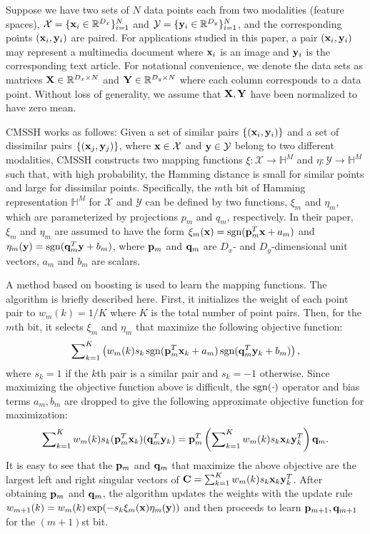 Suppose we have two sets of $N$ data points each from two modalities (\aka feature spaces), $\mathcal{X} = \{{\bf x}_i\in\mathbb{R}^{D_x}\}_{i=1}^{N}$ and $ \mathcal{Y} = \{{\bf y}_i\in\mathbb{R}^{D_y}\}_{i=1}^{N}$, and the corresponding points $({\bf x}_i,{\bf y}_i)$ are paired.  For applications studied in this paper, a pair $({\bf x}_i,{\bf y}_i)$ may represent a multimedia document where ${\bf x}_i$ is an image and ${\bf y}_i$ is the corresponding text article.  For notational convenience, we denote the data sets as matrices ${\bf X}\in\mathbb{R}^{D_x\times N}$ and ${\bf Y}\in\mathbb{R}^{D_y\times N}$ where each column corresponds to a data point. Without loss
of generality, we assume that ${\bf X},{\bf Y}$ have been normalized to have zero mean.

CMSSH works as follows: Given a set of similar pairs $\{({\bf x}_i,{\bf y}_i)\}$ and a set of dissimilar pairs $\{({\bf x}_j,{\bf y}_j)\}$, where ${\bf x}\in\mathcal{X}$ and ${\bf y}\in\mathcal{Y}$ belong to two different modalities, \mbox{CMSSH} constructs two mapping functions $\xi:\mathcal{X}\rightarrow\mathbb{H}^{M}$ and $\eta:\mathcal{Y}\rightarrow\mathbb{H}^{M}$ such that, with high probability, the Hamming distance is small for similar points and large for dissimilar points. Specifically, the $m$th bit of Hamming representation $\mathbb{H}^{M}$ for $\mathcal{X}$ and $\mathcal{Y}$ can be defined by two functions, $\xi_ {m}$ and $\eta_{m}$, which are parameterized by projections $p_{m}$ and $q_{m}$, respectively. In their paper, $\xi_{m}$ and $\eta_{m}$ are assumed to have the form $\xi_{m}({\bf x}) = \mathop{\rm sgn}({\bf p}_{m}^{T}{\bf x}+a_{m})$ and $\eta_{m}({\bf y}) =\mathop{\rm sgn}({\bf q}_{m}^{T}{\bf y}+b_{m})$, where ${\bf p}_{m}$ and ${\bf q}_{m}$ are $D_{x}$- and $D_{y}$-dimensional unit vectors, $a_{m}$ and $b_{m}$ are scalars.

A method based on boosting is used to learn the mapping functions.  The algorithm is briefly described here.  First, it initializes the weight of each point pair to $w_{m}(k) = 1/K$ where $K$ is the total number of point pairs. Then, for the ${m}$th bit, it selects $\xi_{m}$ and $\eta_{m}$ that maximize the following objective function:
$$\sum\nolimits_{k=1}\nolimits^{K}\left(w_{m}(k)s_k\mathop{\rm sgn}({\bf p}_{m}^{T}{\bf x}_k+a_{m})\mathop{\rm sgn}({\bf q}_{m}^{T}{\bf y}_k+b_{m})\right),\nonumber$$
where $s_k=1$ if the $k$th pair is a similar pair and $s_k = -1$ otherwise. Since maximizing the objective function above is difficult, the $\mathop{\rm sgn}(\cdot)$ operator and bias terms $a_{m},b_{m}$ are dropped to give the following approximate objective function for maximization:
$$
\sum\nolimits_{k=1}\nolimits^{K}w_{m}(k)s_k({\bf p}_{m}^{T}{\bf x}_k)({\bf q}_{m}^{T}{\bf y}_k) = {\bf p}_{m}^{T}\left(\sum\nolimits_{k=1}\nolimits^{K}w_{m}(k)s_k{\bf x}_k{\bf y}_k^{T}\right){\bf q}_{m}.
$$
It is easy to see that the ${\bf p}_{m}$ and ${\bf q}_{m}$ that maximize the above objective are the largest left and right singular vectors of ${\bf C} = \sum_{k=1}^{K}w_{m}(k)s_k{\bf x}_k{\bf y}_k^{T}$. After obtaining ${\bf p}_{m}$ and ${\bf q}_{m}$, the algorithm updates the weights with the update rule $w_{m+1}(k) = w_{m}(k)\exp(-s_{k}\xi_{m}({\bf x})\eta_{m}({\bf y}))$ and then proceeds to learn ${\bf p}_{m+1},{\bf q}_{m+1}$ for the $(m+1)$st bit.

